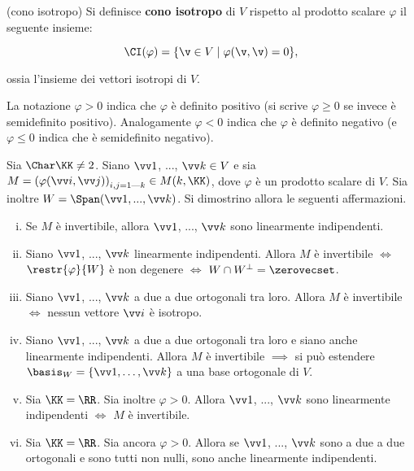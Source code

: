 \documentclass[11pt]{article}
\begin{document}
	\begin{definition} (cono isotropo)
		Si definisce \textbf{cono isotropo} di $V$ rispetto al prodotto scalare $\varphi$ il seguente insieme:
		
		\[ \CI(\varphi) = \{ \v \in V \mid \varphi(\v, \v) = 0 \}, \]
		
		\vskip 0.05in
		
		ossia l'insieme dei vettori isotropi di $V$.
	\end{definition}

	\begin{note}
		La notazione $\varphi > 0$ indica che $\varphi$ è definito positivo (si scrive $\varphi \geq 0$ se invece è semidefinito
		positivo).
		Analogamente $\varphi < 0$ indica che $\varphi$ è definito negativo (e $\varphi \leq 0$ indica che è semidefinito negativo).
	\end{note}

	\begin{exercise} Sia $\Char \KK \neq 2$.
		Siano $\vv1$, ..., $\vv k \in V$ e sia $M = \left( \varphi(\vv i, \vv j) \right)_{i, j = 1\textrm{---}k} \in M(k, \KK)$,
		dove $\varphi$ è un prodotto scalare di $V$. Sia inoltre $W = \Span(\vv 1, ..., \vv k)$. Si dimostrino
		allora le seguenti affermazioni.
		
		\begin{enumerate}[(i)]
			\item Se $M$ è invertibile, allora $\vv 1$, ..., $\vv k$ sono linearmente indipendenti.
			
			\item Siano $\vv 1$, ..., $\vv k$ linearmente indipendenti. Allora $M$ è invertibile $\iff$ $\restr{\varphi}{W}$ è non degenere $\iff$ $W \cap W^\perp = \zerovecset$.
			
			\item Siano $\vv1$, ..., $\vv k$ a due a due ortogonali tra loro. Allora $M$ è invertibile $\iff$ nessun
			vettore $\vv i$ è isotropo.
			
			\item Siano $\vv1$, ..., $\vv k$ a due a due ortogonali tra loro e siano anche linearmente indipendenti.
			Allora $M$ è invertibile $\implies$ si può estendere $\basis_W = \{\vv 1, \ldots, \vv k\}$ a una base ortogonale di $V$.
			
			\item Sia $\KK = \RR$. Sia inoltre $\varphi > 0$. Allora $\vv 1$, ..., $\vv k$ sono linearmente
			indipendenti $\iff$ $M$ è invertibile.
			
			\item Sia $\KK = \RR$. Sia ancora $\varphi > 0$. Allora se $\vv 1$, ..., $\vv k$ sono a due a due
			ortogonali e sono tutti non nulli, sono anche linearmente indipendenti.
		\end{enumerate}
	\end{exercise}
\end{document}
